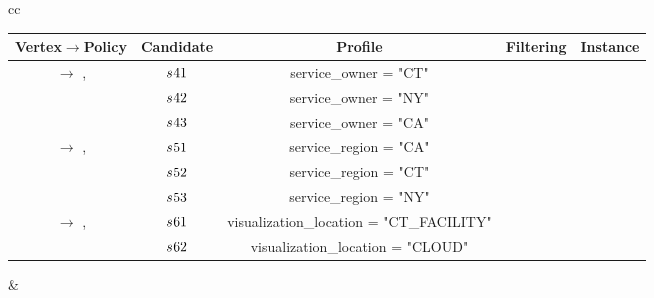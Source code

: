 \begin{example}[\bf \pipelineInstance]
\begin{table*}
{\begin{tabular}[t]{cc}
\begin{tabular}{c|c|c|c|c}
          \textbf{Vertex$\rightarrow$Policy}                   & \textbf{Candidate} & \textbf{Profile}                         & \textbf{Filtering} & \textbf{Instance} \\\hline
          \multirow{ 3}{*}{\vi{4}  $\rightarrow$ \p{1},\p{2} } & $s_{}{41}$           & service\_owner =    "CT"                 & \cmark             & \cmark            \\
                                                               & $s_{}{42}$           & service\_owner =    "NY"                 & \cmark             & \xmark            \\
                                                               & $s_{}{43}$           & service\_owner =    "CA"                 & \xmark             & \xmark            \\
          \hline
          \multirow{ 3}{*}{\vi{5}  $\rightarrow$ \p{5},\p{6} } & $s_{}{51}$           & service\_region =    "CA"                & \xmark             & \xmark            \\
                                                               & $s_{}{52}$           & service\_region =    "CT"                & \cmark             & \cmark            \\
                                                               & $s_{}{53}$           & service\_region =    "NY"                & \cmark             & \xmark            \\
          \hline
          \multirow{ 3}{*}{\vi{6}  $\rightarrow$ \p{7},\p{8} } & $s_{}{61}$           & visualization\_location = "CT\_FACILITY" & \cmark             & \cmark            \\
                                                               & $s_{}{62}$           & visualization\_location = "CLOUD"        & \cmark             & \xmark            \\
        \end{tabular}
                                   &

        \begin{tabular}{c|c}\label{tab:instance_example_maxquality}


\end{tabular}
\end{tabular}}
\end{table*}
\end{example}
